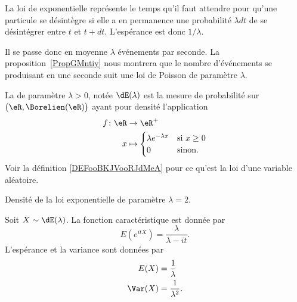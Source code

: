 La loi de exponentielle représente le temps qu'il faut attendre pour qu'une particule se désintègre si elle a en permanence une probabilité \( \lambda dt\) de se désintégrer entre \( t\) et \( t+dt\). L'espérance est donc \( 1/\lambda\).

Il se passe donc en moyenne \( \lambda\) événements par seconde. La proposition~\ref{PropGMntiy} nous montrera que le nombre d'événements se produisant en une seconde suit une loi de Poisson de paramètre \( \lambda\).

\begin{definition}       \label{DEFooTSFNooULWNHY}
    La  de paramètre \( \lambda>0\), notée \( \dE(\lambda)\) est la mesure de probabilité sur \( \big( \eR,\Borelien(\eR) \big)   \) ayant pour densité l'application
    \begin{equation}
        \begin{aligned}
            f\colon \eR&\to \eR^+ \\
            x&\mapsto  
        \begin{cases}
            \lambda e^{-\lambda x} & \text{si } x\geq 0 \\
            0                      & \text{sinon}.
        \end{cases}
        \end{aligned}
    \end{equation}
    Voir la définition \ref{DEFooBKJVooRJdMeA} pour ce qu'est la loi d'une variable aléatoire.
\end{definition}

Densité de la loi exponentielle de paramètre \( \lambda=2\).

\begin{center}
	
\end{center}

\begin{proposition} \label{PropTxGcWn}
    Soit \( X\sim\dE(\lambda)\). La fonction caractéristique est donnée par
	\begin{equation}
		E( e^{itX})=\frac{ \lambda }{ \lambda-it }.
	\end{equation}
	L'espérance et la variance sont données par
	\begin{equation}
		\begin{aligned}[]
			E(X)    & =\frac{1}{ \lambda }    \\
			\Var(X) & =\frac{1}{ \lambda^2 }.
		\end{aligned}
	\end{equation}
\end{proposition}

